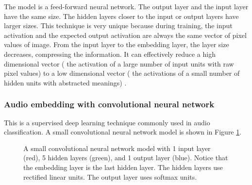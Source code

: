 \documentclass[conference]{IEEEtran}
\begin{document}
The model is a feed-forward neural network.
The output layer and the input layer have the same size.
The hidden layers closer to the input or output layers have larger sizes.
This technique is very unique because during training,
the input activation and the expected output activation are always
the same vector of pixel values of image.
From the input layer to the embedding layer, the layer size decreases,
compressing the information.
It can effectively reduce a high dimensional vector (
the activation of a large number of input units with raw pixel values)
to a low dimensional vector (
the activations of a small number of hidden units with abstracted meanings)
\cite{hinton2006reducing}.

\subsubsection{Audio embedding with convolutional neural network}
This is a supervised deep learning technique commonly used in audio classification.
A small convolutional neural network model is shown in Figure \ref{fig:cnn}.
\begin{figure}[!ht]
	\centering
	\newcommand{\layersep}{1cm}
	\caption{
		A small convolutional neural network model with
		1 input layer (red), 5 hidden layers (green), and 1 output layer (blue).
		Notice that the embedding layer is the last hidden layer.
		The hidden layers use rectified linear units.
		The output layer uses softmax units.
	}
	\label{fig:cnn}
\end{figure}
\end{document}
